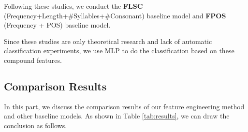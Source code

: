 Following these studies, we conduct the \textbf{FLSC} (Frequency+Length+\#Syllables+\#Consonant) baseline model and \textbf{FPOS} (Frequency + POS) baseline model.

Since these studies are only theoretical research and lack of automatic classification experiments, we use MLP to do the classification based on these compound features.

\subsection{Comparison Results}
\label{sec:res}
In this part, we discuss the comparison results of our feature engineering method and other baseline models.
As shown in Table \ref{tab:results}, we can draw the conclusion as follows.

